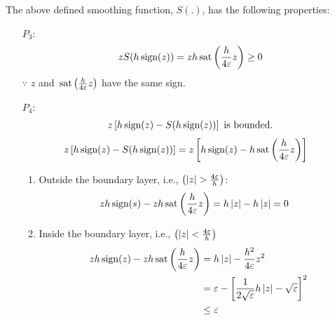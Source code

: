 The above defined smoothing function, $S(.)$, has the following properties:

\begin{itemize}
\item[$P_3$:]
\begin{align}
    z S(h \,\text{sign}(z)) = z h \,\text{sat} \left( \frac{h}{4 \varepsilon} z \right) \geq 0
\end{align}
$\because$ $z$ and $\,\text{sat} \left( \frac{h}{4 \varepsilon} z \right)$ have the same sign.

\item[$P_4$:]
\begin{align}
    z \left[h \,\text{sign}(z) - S(h\,\text{sign}(z)) \right] \text{  is bounded.}
\end{align}
\begin{align*}
    z \left[h \,\text{sign}(z) - S(h\,\text{sign}(z)) \right] &= z \left[h \,\text{sign}(z) - h \,\text{sat} \left( \frac{h}{4 \varepsilon} z \right) \right]
\end{align*}

\begin{enumerate}
\item Outside the boundary layer, i.e., $\left( \left\lvert z \right\rvert > \frac{4 \varepsilon}{h}
 \right)$:
\begin{align*}
    zh \,\text{sign}(s) - z h \,\text{sat} \left( \frac{h}{4 \varepsilon} z \right) &= h \left\lvert z \right\rvert - h\left\lvert z \right\rvert = 0
\end{align*}

\item Inside the boundary layer, i.e., $\left( \left\lvert z \right\rvert < \frac{4 \varepsilon}{h} \right)$
\begin{align*}
    zh \,\text{sign}(z) - z h \,\text{sat} \left( \frac{h}{4 \varepsilon} z \right) &= h \left\lvert z \right\rvert - \frac{h^2}{4 \varepsilon} z^2\\
    &= \varepsilon - \left[ \frac{1}{2 \sqrt{\varepsilon}} h \left\lvert z \right\rvert - \sqrt{\varepsilon} \right]^2\\
    &\leq \varepsilon\\
\end{align*}
\end{enumerate}
\end{itemize}

